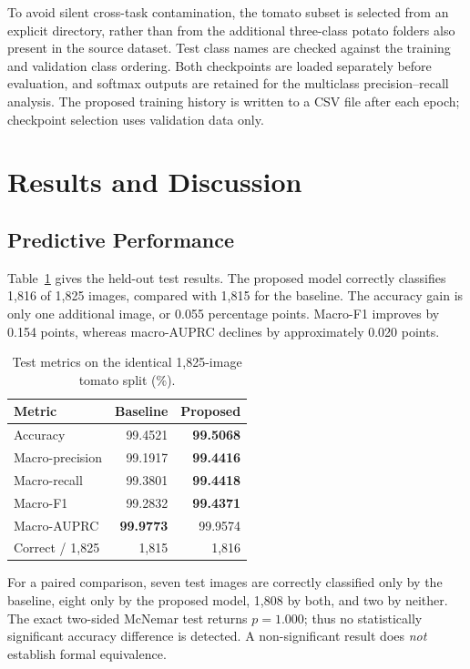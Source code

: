 \documentclass[conference,10pt]{IEEEtran}
\begin{document}
To avoid silent cross-task contamination, the tomato subset is selected from an explicit directory, rather than from the additional three-class potato folders also present in the source dataset. Test class names are checked against the training and validation class ordering. Both checkpoints are loaded separately before evaluation, and softmax outputs are retained for the multiclass precision--recall analysis. The proposed training history is written to a CSV file after each epoch; checkpoint selection uses validation data only.

\section{Results and Discussion}
\subsection{Predictive Performance}
Table~\ref{tab:performance} gives the held-out test results. The proposed model correctly classifies 1,816 of 1,825 images, compared with 1,815 for the baseline. The accuracy gain is only one additional image, or 0.055 percentage points. Macro-F1 improves by 0.154 points, whereas macro-AUPRC declines by approximately 0.020 points.

\begin{table}[t]
\centering
\caption{Test metrics on the identical 1,825-image tomato split (\%).}
\label{tab:performance}
\setlength{\tabcolsep}{4pt}
\begin{tabular}{lrr}
\toprule
Metric & Baseline & Proposed\\
\midrule
Accuracy & 99.4521 & \textbf{99.5068}\\
Macro-precision & 99.1917 & \textbf{99.4416}\\
Macro-recall & 99.3801 & \textbf{99.4418}\\
Macro-F1 & 99.2832 & \textbf{99.4371}\\
Macro-AUPRC & \textbf{99.9773} & 99.9574\\
Correct / 1,825 & 1,815 & 1,816\\
\bottomrule
\end{tabular}
\end{table}

For a paired comparison, seven test images are correctly classified only by the baseline, eight only by the proposed model, 1,808 by both, and two by neither. The exact two-sided McNemar test returns $p=1.000$; thus no statistically significant accuracy difference is detected. A non-significant result does \emph{not} establish formal equivalence.
\end{document}
